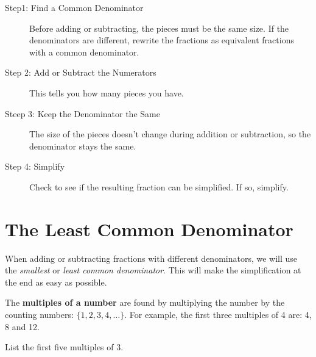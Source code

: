 \documentclass{ximera}
\begin{document}
\begin{procedure}

\begin{description}
  \item[Step1: Find a Common Denominator] 
  
  Before adding or subtracting, the pieces must be the same size.  If the denominators are different, rewrite the fractions 
  as equivalent fractions with a common denominator.

  \item[Step 2: Add or Subtract the Numerators]  
  
  This tells you how many pieces you have.

  \item[Steep 3: Keep the Denominator the Same] The size of the pieces doesn't change during addition or subtraction, so the denominator stays the same.

  \item[Step 4: Simplify]  Check to see if the resulting fraction can be simplified.  If so, simplify.
\end{description}

\end{procedure}


\section*{The Least Common Denominator}

When adding or subtracting fractions with different denominators, we will use the \emph{smallest} or \emph{least common denominator}.  This will
make the simplification at the end as easy as possible.

\begin{definition}

The \textbf{multiples of a number} are found by multiplying the number by the counting numbers: $\{1, 2, 3, 4, \ldots \}.$  
For example, the first three multiples of 4 are: 4, 8 and 12.

\end{definition}


\begin{problem}
List the first five multiples of $3.$ 

\begin{multipleChoice}
\end{multipleChoice} 
\end{problem}
\end{document}
